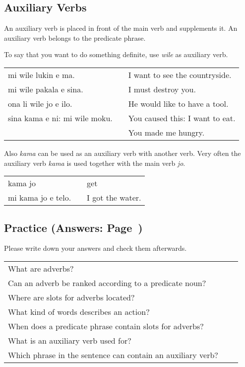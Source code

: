 %
{}
\subsection*{Auxiliary Verbs}
%
An auxiliary verb is placed in front of the main verb and supplements it. 
An auxiliary verb belongs to the predicate phrase. 

To say that you want to do something definite, use \textit{wile} as auxiliary verb. 

\begin{supertabular}{p{5,5cm}|ll}
mi wile lukin e ma. && I want to see the countryside. \\
mi wile pakala e sina. && I must destroy you. \\
ona li wile jo e ilo. && He would like to have a tool. \\
sina kama e ni: mi wile moku. && You caused this: I want to eat. \\ && You made me hungry. \\
\end{supertabular} 

Also \textit{kama} can be used as an auxiliary verb with another verb.
Very often the auxiliary verb \textit{kama} is used together with the main verb \textit{jo}.  

\begin{supertabular}{p{5,5cm}|ll}
kama jo && get \\
mi kama jo e telo. && I got the water. \\
\end{supertabular} 

%
\newpage
\subsection*{Practice (Answers: Page~\pageref{'adverbs'})}

Please write down your answers and check them afterwards. 

\begin{supertabular}{p{5,5cm}|ll}
What are adverbs? &&  \\ %
Can an adverb be ranked according to a predicate noun? &&   \\ %
Where are slots for adverbs located? &&  \\ %
What kind of words describes an action? &&  \\ %
When does a predicate phrase contain slots for adverbs? &&  \\ %
What is an auxiliary verb used for?  &&   \\ %
Which phrase in the sentence can contain an auxiliary verb? &&   \\ %
\end{supertabular}

